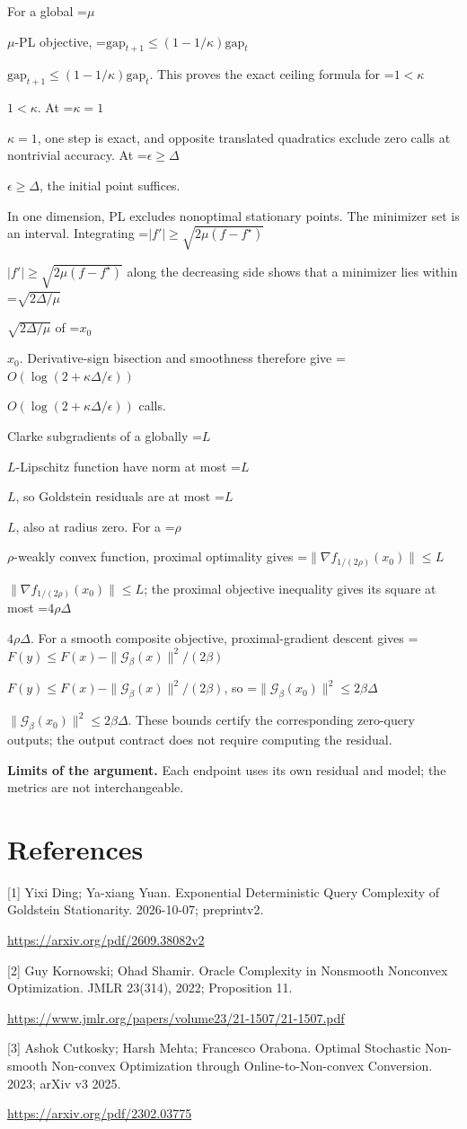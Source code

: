 \documentclass[10pt,a4paper]{article}
\newcommand{\AtlasMath}[1]{\par\begingroup\centering\setbox0=\hbox{$\displaystyle #1$}\ifdim\wd0>1.4\linewidth\typeout{ATLAS WIDE FORMULA: \the\wd0}\fi\ifdim\wd0>\linewidth\resizebox{\linewidth}{!}{\box0}\else\box0\fi\par\endgroup}
\newcommand{\AtlasInlineMath}[1]{\begingroup\setbox0=\hbox{$#1$}\ifdim\wd0>.4\linewidth\endgroup\AtlasMath{#1}\else\endgroup$#1$\fi}
\begin{document}
For a global \AtlasInlineMath{\mu}-PL objective,
\AtlasInlineMath{\mathrm{gap}_{t+1}\le(1-1/\kappa)\mathrm{gap}_t}.
This proves the exact ceiling formula for \AtlasInlineMath{1<\kappa}. At \AtlasInlineMath{\kappa=1}, one step is exact, and opposite translated quadratics exclude zero calls at nontrivial accuracy. At \AtlasInlineMath{\epsilon\ge\Delta}, the initial point suffices.

In one dimension, PL excludes nonoptimal stationary points. The minimizer set is an interval. Integrating
\AtlasInlineMath{|f'|\ge\sqrt{2\mu(f-f^\star)}}
along the decreasing side shows that a minimizer lies within \AtlasInlineMath{\sqrt{2\Delta/\mu}} of \AtlasInlineMath{x_0}. Derivative-sign bisection and smoothness therefore give \AtlasInlineMath{O(\log(2+\kappa\Delta/\epsilon))} calls.

Clarke subgradients of a globally \AtlasInlineMath{L}-Lipschitz function have norm at most \AtlasInlineMath{L}, so Goldstein residuals are at most \AtlasInlineMath{L}, also at radius zero. For a \AtlasInlineMath{\rho}-weakly convex function, proximal optimality gives
\AtlasInlineMath{\|\nabla f_{1/(2\rho)}(x_0)\|\le L}; the proximal objective inequality gives its square at most \AtlasInlineMath{4\rho\Delta}.
For a smooth composite objective, proximal-gradient descent gives
\AtlasInlineMath{F(y)\le F(x)-\|\mathcal G_\beta(x)\|^2/(2\beta)},
so \AtlasInlineMath{\|\mathcal G_\beta(x_0)\|^2\le2\beta\Delta}.
These bounds certify the corresponding zero-query outputs; the output contract does not require computing the residual.

\textbf{Limits of the argument.} Each endpoint uses its own residual and model; the metrics are not interchangeable.

\section{References}
[1] Yixi Ding; Ya-xiang Yuan. Exponential Deterministic Query Complexity of Goldstein Stationarity. 2026-10-07; preprintv2.

\url{https://arxiv.org/pdf/2609.38082v2}

[2] Guy Kornowski; Ohad Shamir. Oracle Complexity in Nonsmooth Nonconvex Optimization. JMLR 23(314), 2022; Proposition 11.

\url{https://www.jmlr.org/papers/volume23/21-1507/21-1507.pdf}

[3] Ashok Cutkosky; Harsh Mehta; Francesco Orabona. Optimal Stochastic Non-smooth Non-convex Optimization through Online-to-Non-convex Conversion. 2023; arXiv v3 2025.

\url{https://arxiv.org/pdf/2302.03775}
\end{document}
